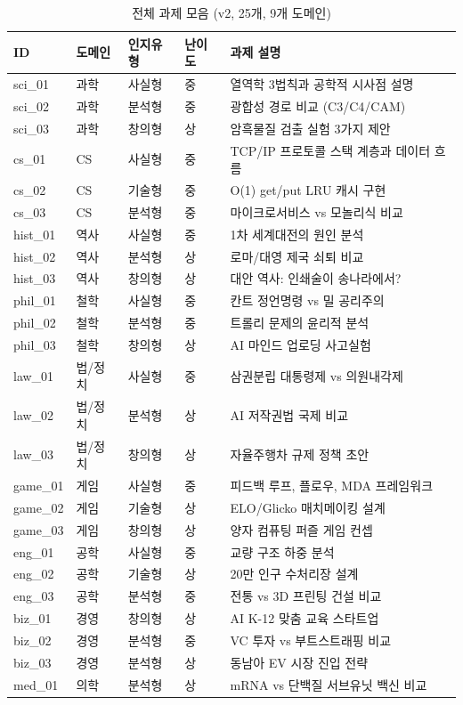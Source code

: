 \begin{table}[H]
\centering
\caption{전체 과제 모음 (v2, 25개, 9개 도메인)}
\label{tab:task-suite}
{\footnotesize
\begin{tabular}{lllll}
\toprule
ID & 도메인 & 인지유형 & 난이도 & 과제 설명 \\
\midrule
sci\_01  & 과학    & 사실형 & 중 & 열역학 3법칙과 공학적 시사점 설명 \\
sci\_02  & 과학    & 분석형 & 중 & 광합성 경로 비교 (C3/C4/CAM) \\
sci\_03  & 과학    & 창의형 & 상 & 암흑물질 검출 실험 3가지 제안 \\
cs\_01   & CS      & 사실형 & 중 & TCP/IP 프로토콜 스택 계층과 데이터 흐름 \\
cs\_02   & CS      & 기술형 & 중 & O(1) get/put LRU 캐시 구현 \\
cs\_03   & CS      & 분석형 & 중 & 마이크로서비스 vs 모놀리식 비교 \\
hist\_01 & 역사    & 사실형 & 중 & 1차 세계대전의 원인 분석 \\
hist\_02 & 역사    & 분석형 & 상 & 로마/대영 제국 쇠퇴 비교 \\
hist\_03 & 역사    & 창의형 & 상 & 대안 역사: 인쇄술이 송나라에서? \\
phil\_01 & 철학    & 사실형 & 중 & 칸트 정언명령 vs 밀 공리주의 \\
phil\_02 & 철학    & 분석형 & 중 & 트롤리 문제의 윤리적 분석 \\
phil\_03 & 철학    & 창의형 & 상 & AI 마인드 업로딩 사고실험 \\
law\_01  & 법/정치 & 사실형 & 중 & 삼권분립 대통령제 vs 의원내각제 \\
law\_02  & 법/정치 & 분석형 & 상 & AI 저작권법 국제 비교 \\
law\_03  & 법/정치 & 창의형 & 상 & 자율주행차 규제 정책 초안 \\
game\_01 & 게임    & 사실형 & 중 & 피드백 루프, 플로우, MDA 프레임워크 \\
game\_02 & 게임    & 기술형 & 상 & ELO/Glicko 매치메이킹 설계 \\
game\_03 & 게임    & 창의형 & 상 & 양자 컴퓨팅 퍼즐 게임 컨셉 \\
eng\_01  & 공학    & 사실형 & 중 & 교량 구조 하중 분석 \\
eng\_02  & 공학    & 기술형 & 상 & 20만 인구 수처리장 설계 \\
eng\_03  & 공학    & 분석형 & 중 & 전통 vs 3D 프린팅 건설 비교 \\
biz\_01  & 경영    & 창의형 & 상 & AI K-12 맞춤 교육 스타트업 \\
biz\_02  & 경영    & 분석형 & 중 & VC 투자 vs 부트스트래핑 비교 \\
biz\_03  & 경영    & 분석형 & 상 & 동남아 EV 시장 진입 전략 \\
med\_01  & 의학    & 분석형 & 상 & mRNA vs 단백질 서브유닛 백신 비교 \\
\bottomrule
\end{tabular}
}
\end{table}

